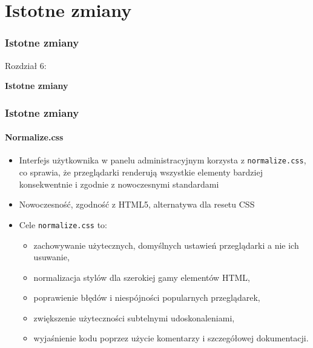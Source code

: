 %
\section{Istotne zmiany}
\begin{frame}[fragile]
	\frametitle{Istotne zmiany}

	\begin{center}\huge{Rozdział 6:}\end{center}
	\begin{center}\huge{\color{typo3darkgrey}\textbf{Istotne zmiany}}\end{center}

\end{frame}


\begin{frame}[fragile]
	\frametitle{Istotne zmiany}
	\framesubtitle{Normalize.css}

	\begin{itemize}
		\item Interfejs użytkownika w panelu administracyjnym korzysta z \texttt{normalize.css},
			co sprawia, że przeglądarki renderują wszystkie elementy bardziej konsekwentnie i zgodnie z nowoczesnymi standardami
		\item Nowoczesność, zgodność z HTML5, alternatywa dla resetu CSS
		\item Cele \texttt{normalize.css} to:

			\begin{itemize}
				\item zachowywanie użytecznych, domyślnych ustawień przeglądarki a nie ich usuwanie,
				\item normalizacja stylów dla szerokiej gamy elementów HTML,
				\item poprawienie błędów i niespójności popularnych przeglądarek,
				\item zwiększenie użyteczności subtelnymi udoskonaleniami,
				\item wyjaśnienie kodu poprzez użycie komentarzy i szczegółowej dokumentacji.
			\end{itemize}

	\end{itemize}

\end{frame}

